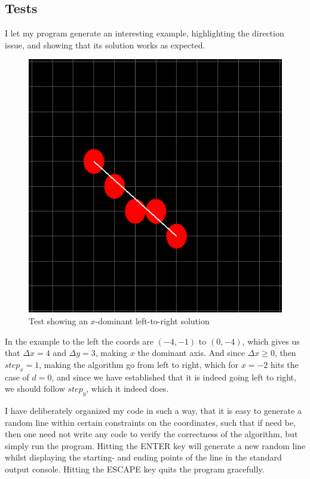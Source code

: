 \documentclass[11pt]{article}
\begin{document}
\subsection{Tests}
I let my program generate an interesting example, highlighting the direction
issue, and showing that its solution works as expected.
\begin{multicols}{2}

    \begin{figure}[H]
        \center
        \includegraphics[scale=0.40]{figures/test1.png}
        \caption{Test showing an $x$-dominant left-to-right solution}
    \end{figure}
    \vfill\columnbreak\noindent
    In the example to the left the coords are $(-4, -1)$ to $(0, -4)$, which
    gives us that $\Delta x = 4$ and $\Delta y = 3$, making $x$ the dominant
    axis. And since $\Delta x \geq 0$, then $step_x = 1$, making the algorithm
    go from left to right, which for $x = -2$ hits the case of $d = 0$, and
    since we have established that it is indeed going left to right, we should
    follow $step_y$, which it indeed does.
    \vfill

\end{multicols}

I have deliberately organized my code in such a way, that it is easy to
generate a random line within certain constraints on the coordinates, such
that if need be, then one need not write any code to verify the correctness of
the algorithm, but simply run the program. Hitting the ENTER key will generate
a new random line whilst displaying the starting- and ending points of the
line in the standard output console. Hitting the ESCAPE key quits the program
gracefully.
\end{document}
